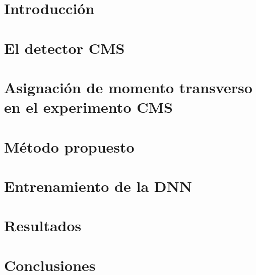 \documentclass[a4paper,11pt]{article}
\begin{document}
\newpage

\tableofcontents

\newpage

\section{Introducci\'on}\label{sec:intro}



\newpage

\section{El detector CMS}\label{sec:CMS}



\newpage

\section{Asignaci\'on de momento transverso en el experimento CMS}\label{sec:current_assignment}



\newpage

\section{M\'etodo propuesto}\label{sec:methodology}



\newpage

\section{Entrenamiento de la DNN}\label{sec:training}



\newpage

\section{Resultados}\label{sec:results}



\newpage

\section{Conclusiones}\label{sec:conclusions}



\newpage



\end{document}
